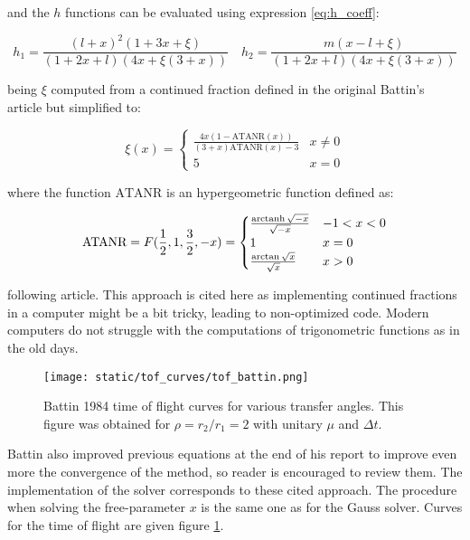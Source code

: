 and the $h$ functions can be evaluated using expression \ref{eq:h_coeff}:

\begin{equation}
	h_1 = \frac{(l+x)^2(1 + 3x + \xi)}{(1+2x+l)(4x + \xi(3+x))}\quad
	h_2 = \frac{m(x-l+\xi)}{(1+2x+l)(4x + \xi(3+x))}
	\label{eq:h_coeff}
\end{equation}

being $\xi$ computed from a continued fraction defined in the original Battin's
article but simplified to:

\begin{equation}
  \xi(x) =
  \begin{cases}
	  \frac{4x(1 - \text{ATANR}(x))}{(3 +x)\text{ATANR}(x) - 3} &
	  \text{$x\neq0$}\\
	  5 & \text{$x = 0$}
  \end{cases}
\end{equation}

where the function $\text{ATANR}$ is an hypergeometric function defined as:

\begin{equation}
  \text{ATANR} = F(\frac{1}{2}, 1, \frac{3}{2}, -x) =
  \begin{cases}
	  \frac{\operatorname{arctanh}{\sqrt{-x}}}{\sqrt{-x}} & \text{$-1 < x < 0$}\\
	  1 & \text{$x = 0$} \\
	  \frac{\arctan{\sqrt{x}}}{\sqrt{x}} & \text{$x > 0$}
  \end{cases}
\end{equation}

following \cite{allen2015} article. This approach is cited here as
implementing continued fractions in a computer might be a bit tricky, leading to
non-optimized code. Modern computers do not struggle with the computations of
trigonometric functions as in the old days.

\vspace{0.5cm}
\begin{figure}[h]
  \centering
  \texttt{[image: static/tof\_curves/tof\_battin.png]}
  \caption{Battin 1984 time of flight curves for various transfer angles. This
  figure was obtained for $\rho=r_2/r_1=2$ with unitary $\mu$ and $\Delta t$.}
  \label{fig:tof_battin}
\end{figure}


Battin also improved previous equations at the end of his report to improve even
more the convergence of the method, so reader is encouraged to review them. The
implementation of the solver corresponds to these cited approach. The procedure
when solving the free-parameter $x$ is the same one as for the Gauss solver.
Curves for the time of flight are given figure \ref{fig:tof_battin}.


